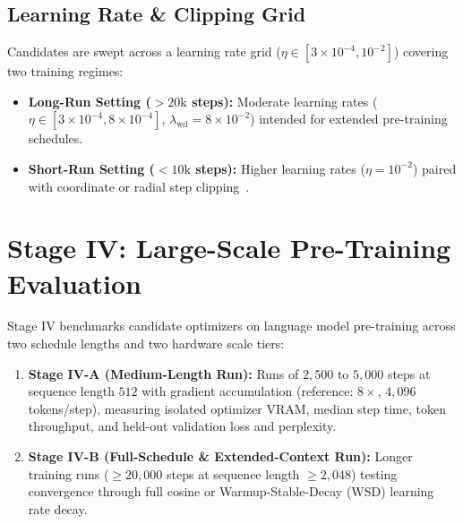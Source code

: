 \documentclass[11pt,a4paper]{article}
\renewcommand{\_}{\origunderscore\allowbreak}
\begin{document}
\subsection{Learning Rate \& Clipping Grid}
\noindent
Candidates are swept across a learning rate grid ($\eta \in [3 \times 10^{-4}, 10^{-2}]$) covering two training regimes:
\begin{itemize}[leftmargin=1.8em, itemsep=0.25em]
    \item \textbf{Long-Run Setting ($> 20\text{k}$ steps):} Moderate learning rates ($\eta \in [3 \times 10^{-4}, 8 \times 10^{-4}]$, $\lambda_{\text{wd}} = 8 \times 10^{-2}$) intended for extended pre-training schedules.
    \item \textbf{Short-Run Setting ($< 10\text{k}$ steps):} Higher learning rates ($\eta = 10^{-2}$) paired with coordinate or radial step clipping~\cite{brock2021nfnet}.
\end{itemize}

\section{Stage IV: Large-Scale Pre-Training Evaluation}
\noindent
Stage IV benchmarks candidate optimizers on language model pre-training across two schedule lengths and two hardware scale tiers:

\begin{enumerate}[leftmargin=1.8em, itemsep=0.35em]
    \item \textbf{Stage IV-A (Medium-Length Run):} Runs of $2,500$ to $5,000$ steps at sequence length $512$ with gradient accumulation (reference: $8\times$, $4,096$ tokens/step), measuring isolated optimizer VRAM, median step time, token throughput, and held-out validation loss and perplexity.
    \item \textbf{Stage IV-B (Full-Schedule \& Extended-Context Run):} Longer training runs ($\ge 20,000$ steps at sequence length $\ge 2,048$) testing convergence through full cosine or Warmup-Stable-Decay (WSD) learning rate decay.
\end{enumerate}
\end{document}
